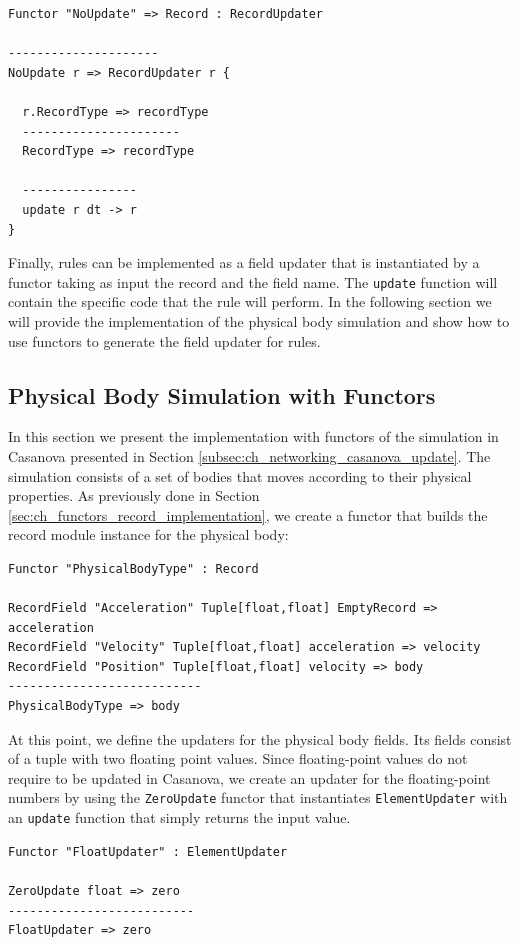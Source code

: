\begin{lstlisting}
Functor "NoUpdate" => Record : RecordUpdater

---------------------
NoUpdate r => RecordUpdater r {

  r.RecordType => recordType
  ----------------------
  RecordType => recordType
  
  ----------------
  update r dt -> r
}
\end{lstlisting}

\noindent
Finally, rules can be implemented as a field updater that is instantiated by a functor taking as input the record and the field name. The \texttt{update} function will contain the specific code that the rule will perform. In the following section we will provide the implementation of the physical body simulation and show how to use functors to generate the field updater for rules.

\subsection{Physical Body Simulation with Functors}
\label{subsec:ch_networking_simulation}
In this section we present the implementation with functors of the simulation in Casanova presented in Section \ref{subsec:ch_networking_casanova_update}. The simulation consists of a set of bodies that moves according to their physical properties. As previously done in Section \ref{sec:ch_functors_record_implementation}, we create a functor that builds the record module instance for the physical body:

\begin{lstlisting}
Functor "PhysicalBodyType" : Record

RecordField "Acceleration" Tuple[float,float] EmptyRecord => acceleration
RecordField "Velocity" Tuple[float,float] acceleration => velocity
RecordField "Position" Tuple[float,float] velocity => body
---------------------------
PhysicalBodyType => body
\end{lstlisting}

\noindent
At this point, we define the updaters for the physical body fields. Its fields consist of a tuple with two floating point values. Since floating-point values do not require to be updated in Casanova, we create an updater for the floating-point numbers by using the \texttt{ZeroUpdate} functor that instantiates \texttt{ElementUpdater} with an \texttt{update} function that simply returns the input value.

\begin{lstlisting}
Functor "FloatUpdater" : ElementUpdater

ZeroUpdate float => zero
--------------------------
FloatUpdater => zero
\end{lstlisting}

